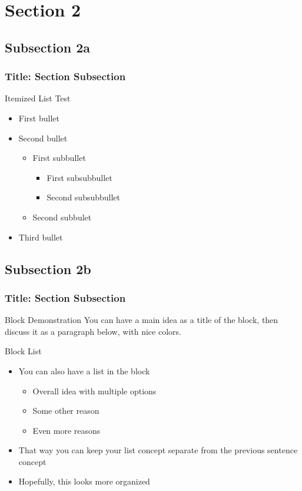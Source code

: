 \documentclass[aspectratio=43]{beamer}
\begin{document}
\section{Section 2}

\subsection{Subsection 2a}

\begin{frame}
\frametitle{Title: Section \thesection Subsection \thesubsection}
Itemized List Test
\begin{itemize}
    \item First bullet
    \item Second bullet
    \begin{itemize}
        \item First subbullet
        \begin{itemize}
            \item First subsubbullet
            \item Second subsubbullet
        \end{itemize}
        \item Second subbulet
    \end{itemize}
    \item Third bullet
\end{itemize}
\end{frame}

\subsection{Subsection 2b}

\begin{frame}
\frametitle{Title: Section \thesection Subsection \thesubsection}
\begin{block}{Block Demonstration}
You can have a main idea as a title of the block, then discuss it as a paragraph below, with nice colors.
\end{block}
\begin{block}{Block List}
    \begin{itemize}
      \item You can also have a list in the block
        \begin{itemize}
          \item Overall idea with multiple options
          \item Some other reason
          \item Even more reasons
        \end{itemize}
      \item That way you can keep your list concept separate from the previous sentence concept
      \item Hopefully, this looks more organized
    \end{itemize}
\end{block}
\end{frame}
\end{document}

